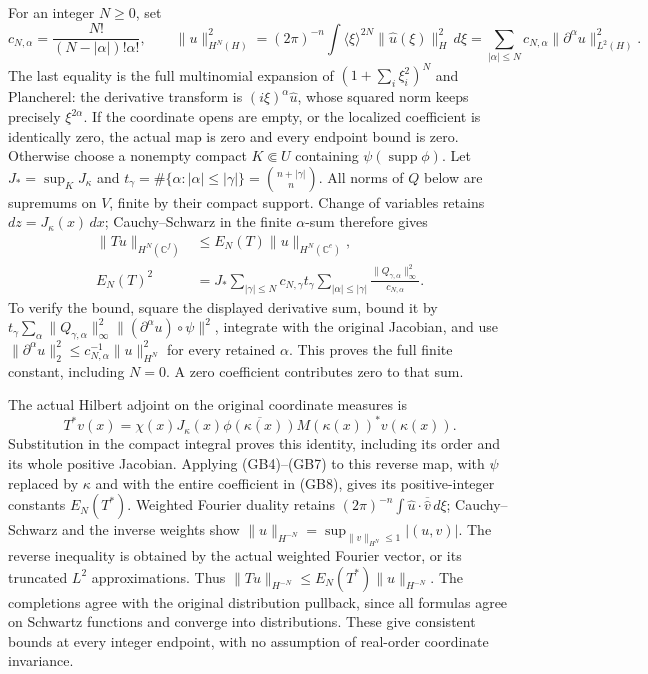 \documentclass[
  11pt,
]{article}
\begin{document}
For an integer \(N\ge0\), set \[
 c_{N,\alpha}=\frac{N!}{(N-|\alpha|)!\alpha!},\qquad
 \|u\|_{H^N(H)}^2=(2\pi)^{-n}
       \int\langle\xi\rangle^{2N}\|\widehat u(\xi)\|_H^2\,d\xi
       =\sum_{|\alpha|\le N}c_{N,\alpha}
          \|\partial^\alpha u\|_{L^2(H)}^2.
 \tag{GB6}
\] The last equality is the full multinomial expansion of
\((1+\sum_i\xi_i^2)^N\) and Plancherel: the derivative transform is
\((i\xi)^\alpha\widehat u\), whose squared norm keeps precisely
\(\xi^{2\alpha}\). If the coordinate opens are empty, or the localized
coefficient is identically zero, the actual map is zero and every
endpoint bound is zero. Otherwise choose a nonempty compact
\(K\Subset U\) containing \(\psi(\operatorname{supp}\phi)\). Let
\(J_*=\sup_K J_\kappa\) and
\(t_\gamma=\#\{\alpha:|\alpha|\le|\gamma|\}=\binom{n+|\gamma|}{n}\). All
norms of \(Q\) below are supremums on \(V\), finite by their compact
support. Change of variables retains \(dz=J_\kappa(x)\,dx\);
Cauchy--Schwarz in the finite \(\alpha\)-sum therefore gives \[
 \begin{aligned}
 \|Tu\|_{H^N(\mathbb C^f)}&\le E_N(T)
                       \|u\|_{H^N(\mathbb C^e)},\\
 E_N(T)^2&=
 J_*\sum_{|\gamma|\le N}c_{N,\gamma}t_\gamma
      \sum_{|\alpha|\le|\gamma|}
        \frac{\|Q_{\gamma,\alpha}\|_\infty^2}{c_{N,\alpha}}.
 \end{aligned}
 \tag{GB7}
\] To verify the bound, square the displayed derivative sum, bound it by
\(t_\gamma\sum_\alpha\|Q_{\gamma,\alpha}\|_\infty^2
\|(\partial^\alpha u)\circ\psi\|^2\), integrate with the original
Jacobian, and use
\(\|\partial^\alpha u\|_2^2\le c_{N,\alpha}^{-1}\|u\|_{H^N}^2\) for
every retained \(\alpha\). This proves the full finite constant,
including \(N=0\). A zero coefficient contributes zero to that sum.

The actual Hilbert adjoint on the original coordinate measures is \[
 T^*v(x)=
 \chi(x)J_\kappa(x)\overline{\phi(\kappa(x))}
          M(\kappa(x))^*v(\kappa(x)).
 \tag{GB8}
\] Substitution in the compact integral proves this identity, including
its order and its whole positive Jacobian. Applying (GB4)--(GB7) to this
reverse map, with \(\psi\) replaced by \(\kappa\) and with the entire
coefficient in (GB8), gives its positive-integer constants \(E_N(T^*)\).
Weighted Fourier duality retains
\((2\pi)^{-n}\int\widehat u\cdot\overline{\widehat v}\,d\xi\);
Cauchy--Schwarz and the inverse weights show
\(\|u\|_{H^{-N}}=\sup_{\|v\|_{H^N}\le1}|(u,v)|\). The reverse inequality
is obtained by the actual weighted Fourier vector, or its truncated
\(L^2\) approximations. Thus
\(\|Tu\|_{H^{-N}}\le E_N(T^*)\|u\|_{H^{-N}}\). The completions agree
with the original distribution pullback, since all formulas agree on
Schwartz functions and converge into distributions. These give
consistent bounds at every integer endpoint, with no assumption of
real-order coordinate invariance.
\end{document}
